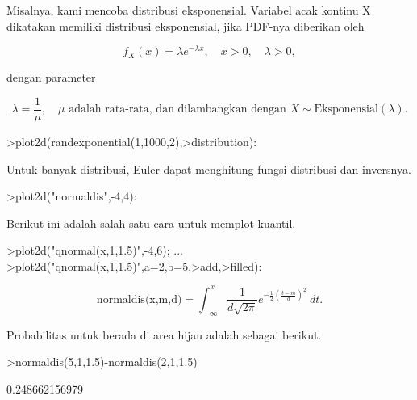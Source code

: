 \documentclass[a4paper,10pt]{article}
\begin{document}
\begin{eulernotebook}
\begin{eulercomment}
\begin{eulercomment}
\begin{eulercomment}
\begin{eulercomment}
\begin{eulercomment}
\begin{eulercomment}
\begin{eulercomment}
\begin{eulercomment}
\begin{eulercomment}
\begin{eulercomment}
\begin{eulercomment}
\begin{eulercomment}
\begin{eulercomment}
\begin{eulercomment}
\begin{eulercomment}
\begin{eulercomment}
\begin{eulercomment}
\begin{eulercomment}
\begin{eulercomment}
Misalnya, kami mencoba distribusi eksponensial. Variabel acak kontinu
X dikatakan memiliki distribusi eksponensial, jika PDF-nya diberikan
oleh\\
\end{eulercomment}
\begin{eulerformula}
\[
f_X(x)=\lambda e^{-\lambda x},\quad x>0,\quad \lambda>0,
\]
\end{eulerformula}
\begin{eulercomment}
dengan parameter\\
\end{eulercomment}
\begin{eulerformula}
\[
\lambda=\frac{1}{\mu},\quad \mu \text{ adalah rata-rata, dan dilambangkan dengan } X \sim \text{Eksponensial}(\lambda).
\]
\end{eulerformula}
\begin{eulerprompt}
>plot2d(randexponential(1,1000,2),>distribution):
\end{eulerprompt}
\begin{eulercomment}
Untuk banyak distribusi, Euler dapat menghitung fungsi distribusi dan
inversnya.
\end{eulercomment}
\begin{eulerprompt}
>plot2d("normaldis",-4,4): 
\end{eulerprompt}
\begin{eulercomment}
Berikut ini adalah salah satu cara untuk memplot kuantil.
\end{eulercomment}
\begin{eulerprompt}
>plot2d("qnormal(x,1,1.5)",-4,6);  ...
>plot2d("qnormal(x,1,1.5)",a=2,b=5,>add,>filled):
\end{eulerprompt}
\begin{eulerformula}
\[
\text{normaldis(x,m,d)}=\int_{-\infty}^x \frac{1}{d\sqrt{2\pi}}e^{-\frac{1}{2 }(\frac{t-m}{d})^2}\ dt.
\]
\end{eulerformula}
\begin{eulercomment}
Probabilitas untuk berada di area hijau adalah sebagai berikut.
\end{eulercomment}
\begin{eulerprompt}
>normaldis(5,1,1.5)-normaldis(2,1,1.5)
\end{eulerprompt}
\begin{euleroutput}
  0.248662156979

\end{euleroutput}
\end{eulercomment}
\end{eulercomment}
\end{eulercomment}
\end{eulercomment}
\end{eulercomment}
\end{eulercomment}
\end{eulercomment}
\end{eulercomment}
\end{eulercomment}
\end{eulercomment}
\end{eulercomment}
\end{eulercomment}
\end{eulercomment}
\end{eulercomment}
\end{eulercomment}
\end{eulercomment}
\end{eulercomment}
\end{eulercomment}
\end{eulernotebook}
\end{document}
